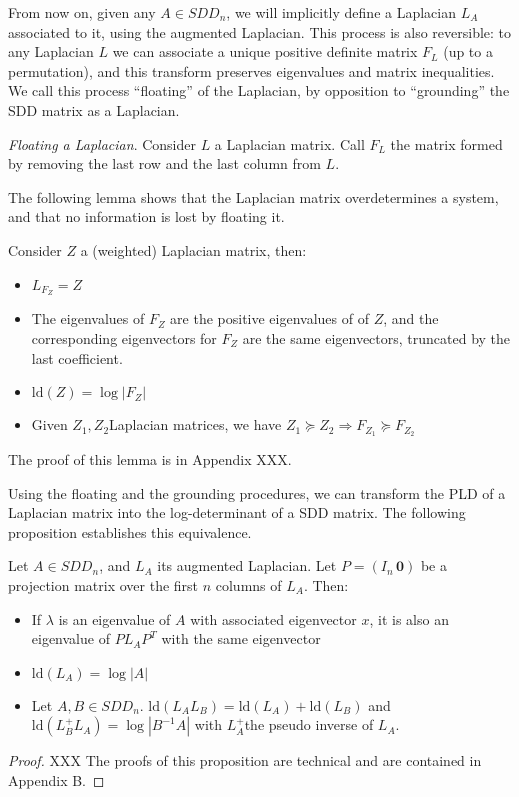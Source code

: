 From now on, given any $A\in SDD_{n}$, we will implicitly define
a Laplacian $L_{A}$ associated to it, using the augmented Laplacian.
This process is also reversible: to any Laplacian $L$ we can associate
a unique positive definite matrix $F_{L}$ (up to a permutation),
and this transform preserves eigenvalues and matrix inequalities.
We call this process ``floating'' of the Laplacian, by opposition
to ``grounding'' the SDD matrix as a Laplacian. 

\begin{definition}\emph{Floating a Laplacian}. Consider $L$ a Laplacian
matrix. Call $F_{L}$ the matrix formed by removing the last row and
the last column from $L$.

\end{definition}

The following lemma shows that the Laplacian matrix overdetermines
a system, and that no information is lost by floating it.

\begin{lemma}Consider $Z$ a (weighted) Laplacian matrix, then:
\begin{itemize}
\item $L_{F_{Z}}=Z$
\item The eigenvalues of $F_{Z}$ are the positive eigenvalues of of $Z$,
and the corresponding eigenvectors for $F_{Z}$ are the same eigenvectors,
truncated by the last coefficient.
\item $\text{ld}\left(Z\right)=\log\left|F_{Z}\right|$
\item Given $Z_{1},Z_{2}$Laplacian matrices, we have $Z_{1}\succeq Z_{2}\Rightarrow F_{Z_{1}}\succeq F_{Z_{2}}$
\end{itemize}
\end{lemma}

The proof of this lemma is in Appendix XXX.

Using the floating and the grounding procedures, we can transform
the PLD of a Laplacian matrix into the log-determinant of a SDD matrix.
The following proposition establishes this equivalence.

\begin{proposition} \label{pro:pld-properties}Let $A\in SDD_{n}$,
and $L_{A}$ its augmented Laplacian. Let $P=\left(I_{n}\,\mathbf{0}\right)$
be a projection matrix over the first $n$ columns of $L_{A}$. Then:\end{proposition} 
\begin{itemize}
\item If $\lambda$ is an eigenvalue of $A$ with associated eigenvector
$x$, it is also an eigenvalue of $PL_{A}P^{T}$ with the same eigenvector 
\item $\text{ld}\left(L_{A}\right)=\log\left|A\right|$ 
\item Let $A,B\in SDD_{n}$. $\text{ld}\left(L_{A}L_{B}\right)=\text{ld}\left(L_{A}\right)+\text{ld}\left(L_{B}\right)$
and $\text{ld}\left(L_{B}^{+}L_{A}\right)=\log\left|B^{-1}A\right|$
with $L_{A}^{+}$the pseudo inverse of $L_{A}$. 
\end{itemize}
\begin{proof}XXX The proofs of this proposition are technical and
are contained in Appendix B. \end{proof} 


